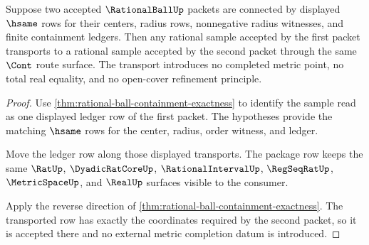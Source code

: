 \begin{theorem}
\label{thm:rational-ball-refinement-transport}
Suppose two accepted $\RationalBallUp$ packets are connected by displayed
$\hsame$ rows for their centers, radius rows, nonnegative radius witnesses,
and finite containment ledgers. Then any rational sample accepted by the
first packet transports to a rational sample accepted by the second packet
through the same $\Cont$ route surface. The transport introduces no completed
metric point, no total real equality, and no open-cover refinement principle.
\end{theorem}
\begin{proof}
Use \autoref{thm:rational-ball-containment-exactness} to identify the sample
read as one displayed ledger row of the first packet. The hypotheses provide
the matching $\hsame$ rows for the center, radius, order witness, and ledger.

Move the ledger row along those displayed transports. The package row keeps
the same $\RatUp$, $\DyadicRatCoreUp$, $\RationalIntervalUp$,
$\RegSeqRatUp$, $\MetricSpaceUp$, and $\RealUp$ surfaces visible to the
consumer.

Apply the reverse direction of
\autoref{thm:rational-ball-containment-exactness}. The transported row has
exactly the coordinates required by the second packet, so it is accepted
there and no external metric completion datum is introduced.
\end{proof}

